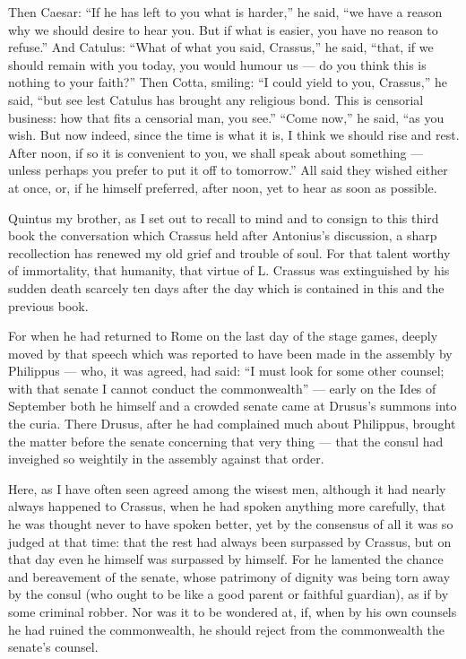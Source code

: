  Then Caesar: ``If he has left to you what is harder,'' he said, ``we have a reason why we should desire to hear you. But if what is easier, you have no reason to refuse.'' And Catulus: ``What of what you said, Crassus,'' he said, ``that, if we should remain with you today, you would humour us — do you think this is nothing to your faith?'' Then Cotta, smiling: ``I could yield to you, Crassus,'' he said, ``but see lest Catulus has brought any religious bond. This is censorial business: how that fits a censorial man, you see.'' ``Come now,'' he said, ``as you wish. But now indeed, since the time is what it is, I think we should rise and rest. After noon, if so it is convenient to you, we shall speak about something — unless perhaps you prefer to put it off to tomorrow.'' All said they wished either at once, or, if he himself preferred, after noon, yet to hear as soon as possible.


 Quintus my brother, as I set out to recall to mind and to consign to this third book the conversation which Crassus held after Antonius's discussion, a sharp recollection has renewed my old grief and trouble of soul. For that talent worthy of immortality, that humanity, that virtue of L. Crassus was extinguished by his sudden death scarcely ten days after the day which is contained in this and the previous book.

 For when he had returned to Rome on the last day of the stage games, deeply moved by that speech which was reported to have been made in the assembly by Philippus — who, it was agreed, had said: ``I must look for some other counsel; with that senate I cannot conduct the commonwealth'' — early on the Ides of September both he himself and a crowded senate came at Drusus's summons into the curia. There Drusus, after he had complained much about Philippus, brought the matter before the senate concerning that very thing — that the consul had inveighed so weightily in the assembly against that order.

 Here, as I have often seen agreed among the wisest men, although it had nearly always happened to Crassus, when he had spoken anything more carefully, that he was thought never to have spoken better, yet by the consensus of all it was so judged at that time: that the rest had always been surpassed by Crassus, but on that day even he himself was surpassed by himself. For he lamented the chance and bereavement of the senate, whose patrimony of dignity was being torn away by the consul (who ought to be like a good parent or faithful guardian), as if by some criminal robber. Nor was it to be wondered at, if, when by his own counsels he had ruined the commonwealth, he should reject from the commonwealth the senate's counsel.

